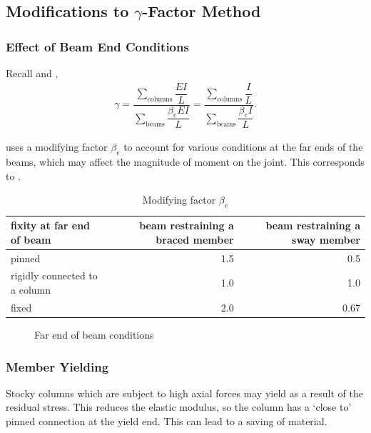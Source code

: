 \subsection{Modifications to \texorpdfstring{$\gamma$}{G}-Factor Method}
\subsubsection{Effect of Beam End Conditions}
Recall  and ,
\begin{gather*}
\gamma=\dfrac{\displaystyle\sum_{\text{columns}}\dfrac{EI}{L}}{\displaystyle\sum_{\text{beams}}\dfrac{\beta_eEI}{L}}=\dfrac{\displaystyle\sum_{\text{columns}}\dfrac{I}{L}}{\displaystyle\sum_{\text{beams}}\dfrac{\beta_eI}{L}}.
\end{gather*}

 uses a modifying factor $\beta_e$ to account for various conditions at the far ends of the beams, which may affect the magnitude of moment on the joint. This corresponds to .
\begin{table}[H]
\centering\footnotesize
\caption{Modifying factor $\beta_e$}\label{tab:beta_e}
\begin{tabular}{lrr}
	\toprule
	fixity at far end of beam     & beam restraining a braced member & beam restraining a sway member \\ \midrule
	pinned                        &                              1.5 &                            0.5 \\
	rigidly connected to a column &                              1.0 &                            1.0 \\
	fixed                         &                              2.0 &                           0.67 \\ \bottomrule
\end{tabular}
\end{table}
\begin{figure}[H]
\centering

\caption{Far end of beam conditions}
\end{figure}
\subsubsection{Member Yielding}
Stocky columns which are subject to high axial forces may yield as a result of the residual stress. This reduces the elastic modulus, so the column has a `close to' pinned connection at the yield end. This can lead to a saving of material.

